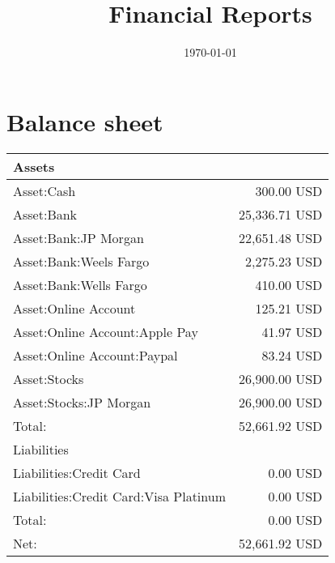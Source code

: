 \documentclass[11pt]{article}
\date{\today}
\title{Financial Reports}
\begin{document}
\maketitle

\section{Balance sheet}
\label{sec:org4132055}
\begin{center}
\begin{tabular}{lr} \toprule
Assets   & \\ \midrule
Asset:Cash & 300.00 USD  \\
Asset:Bank & 25,336.71 USD  \\
Asset:Bank:JP Morgan & 22,651.48 USD  \\
Asset:Bank:Weels Fargo & 2,275.23 USD  \\
Asset:Bank:Wells Fargo & 410.00 USD  \\
Asset:Online Account & 125.21 USD  \\
Asset:Online Account:Apple Pay & 41.97 USD  \\
Asset:Online Account:Paypal & 83.24 USD  \\
Asset:Stocks & 26,900.00 USD  \\
Asset:Stocks:JP Morgan & 26,900.00 USD  \\ \midrule
Total: & 52,661.92 USD  \\ \midrule
Liabilities   & \\
Liabilities:Credit Card & 0.00 USD  \\
Liabilities:Credit Card:Visa Platinum & 0.00 USD  \\ \midrule
Total: & 0.00 USD  \\ \midrule
Net: & 52,661.92 USD  \\ \bottomrule
\end{tabular}
\end{center}
\end{document}
